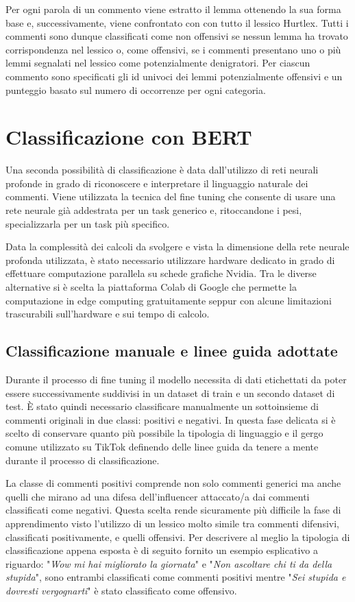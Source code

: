     Per ogni parola di un commento viene estratto il lemma ottenendo la sua forma base e, successivamente, viene confrontato con con tutto il lessico Hurtlex. Tutti i commenti sono dunque classificati come non offensivi se nessun lemma ha trovato corrispondenza nel lessico o, come offensivi, se i commenti presentano uno o più lemmi segnalati nel lessico come potenzialmente denigratori.
    Per ciascun commento sono specificati gli id univoci dei lemmi potenzialmente offensivi e un punteggio basato sul numero di occorrenze per ogni categoria.






\section{Classificazione con BERT}
Una seconda possibilità di classificazione è data dall'utilizzo di reti neurali profonde in grado di riconoscere e interpretare il linguaggio naturale dei commenti. Viene utilizzata la tecnica del fine tuning che consente di usare una rete neurale già addestrata per un task generico e, ritoccandone i pesi, specializzarla per un task più specifico.

Data la complessità dei calcoli da svolgere e vista la dimensione della rete neurale profonda utilizzata, è stato necessario utilizzare hardware dedicato in grado di effettuare computazione parallela su schede grafiche Nvidia. Tra le diverse alternative si è scelta la piattaforma Colab di Google che permette la computazione in edge computing gratuitamente seppur con alcune limitazioni trascurabili sull'hardware e sui tempo di calcolo.

\subsection{Classificazione manuale e linee guida adottate}
    Durante il processo di fine tuning il modello necessita di dati etichettati da poter essere successivamente suddivisi in un dataset di train e un secondo dataset di test. È stato quindi necessario classificare manualmente un sottoinsieme di commenti originali in due classi: positivi e negativi. In questa fase delicata si è scelto di conservare quanto più possibile la tipologia di linguaggio e il gergo comune utilizzato su TikTok definendo delle linee guida da tenere a mente durante il processo di classificazione. 
    
    La classe di commenti positivi comprende non solo commenti generici ma anche quelli che mirano ad una difesa dell'influencer attaccato/a dai commenti classificati come negativi. Questa scelta rende sicuramente più difficile la fase di apprendimento visto l'utilizzo di un lessico molto simile tra commenti difensivi, classificati positivamente, e  quelli offensivi. Per descrivere al meglio la tipologia di classificazione appena esposta è di seguito fornito un esempio esplicativo a riguardo: "\textit{Wow mi hai migliorato la giornata}" e "\textit{Non ascoltare chi ti da della stupida}", sono entrambi classificati come commenti positivi mentre "\textit{Sei stupida e dovresti vergognarti}" è stato classificato come offensivo.
    
